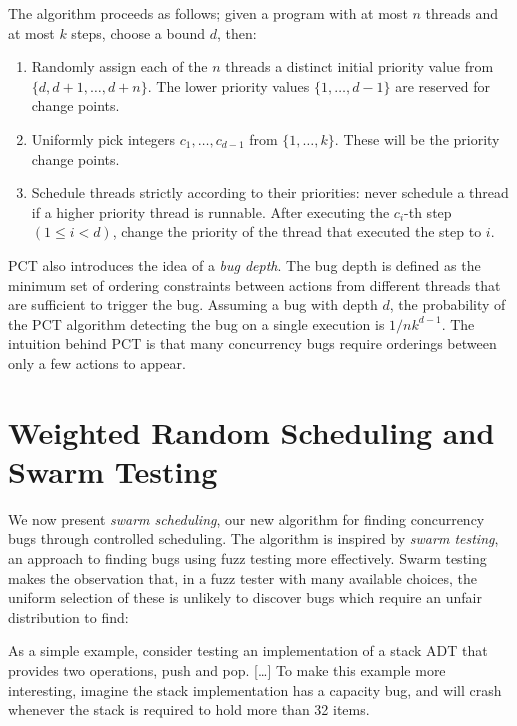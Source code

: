The algorithm proceeds as follows; given a program with at most $n$
threads and at most $k$ steps, choose a bound $d$, then:

\begin{enumerate}
\item Randomly assign each of the $n$ threads a distinct initial priority value
  from $\{d, d + 1, \ldots, d+n\}$.  The lower priority values
  $\{1, \ldots, d−1\}$ are reserved for change points.
\item Uniformly pick integers $c_1, \ldots, c_{d−1}$ from $\{1, \ldots, k\}$.
  These will be the priority change points.
\item Schedule threads strictly according to their priorities: never schedule a
  thread if a higher priority thread is runnable.  After executing the $c_i$-th
  step $(1 \leq i < d)$, change the priority of the thread that executed the
  step to $i$.
\end{enumerate}

PCT also introduces the idea of a \emph{bug depth}.  The bug depth is
defined as the minimum set of ordering constraints between actions
from different threads that are sufficient to trigger the
bug\cite{burckhardt2010}.  Assuming a bug with depth $d$, the
probability of the PCT algorithm detecting the bug on a single
execution is $1/nk^{d−1}$.  The intuition behind PCT is that many
concurrency bugs require orderings between only a few actions to
appear.

\section{Weighted Random Scheduling and Swarm Testing}
\label{sec:algorithms-swarm}

We now present \emph{swarm scheduling}, our new algorithm for finding
concurrency bugs through controlled scheduling.  The algorithm is inspired by
\emph{swarm testing}\cite{groce2012}, an approach to finding bugs using fuzz
testing more effectively.  Swarm testing makes the observation that, in a fuzz
tester with many available choices, the uniform selection of these is unlikely
to discover bugs which require an unfair distribution to find:

\begin{displayquote}
  As a simple example, consider testing an implementation of a stack ADT that
  provides two operations, push and pop. [\ldots] To make this example more
  interesting, imagine the stack implementation has a capacity bug, and will
  crash whenever the stack is required to hold more than 32
  items.\cite{groce2012}
\end{displayquote}


